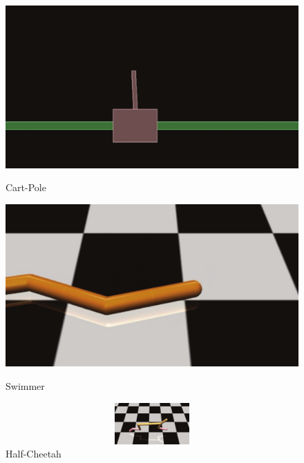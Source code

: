\begin{figure}[h]
	\begin{minipage}[t]{0.32\textwidth}
		\includegraphics[width=1\textwidth]{Images/Experiments/cart.pdf}
		\vspace{-0.1in}
		\caption{Cart-Pole}
		\label{fig:cartpoletask}
	\end{minipage}
	\begin{minipage}[t]{0.32\textwidth}
		\includegraphics[width=1\textwidth]{Images/Experiments/swimmer.pdf}
		\vspace{-0.1in}
		\caption{Swimmer}
		\label{fig:swimmertask}
	\end{minipage}
	\begin{minipage}[t]{.34\textwidth}
		\includegraphics[height=60,width=1\textwidth]{Images/Experiments/half.pdf}
		\vspace{-0.1in}
		\caption{Half-Cheetah}
		\label{fig:halfcheetahtask}
	\end{minipage}
	\vspace{-0.15in}
\end{figure}

